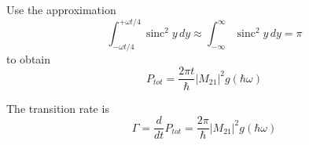 \documentclass[12pt]{article}
\begin{document}
Use the approximation
\begin{equation*}
\int_{-\omega t/4}^{+\omega t/4}\operatorname{sinc}^2 y\,dy
\approx
\int_{-\infty}^\infty\operatorname{sinc}^2 y\,dy=\pi
\end{equation*}
%
to obtain
\begin{equation*}
P_{tot}=\frac{2\pi t}{\hbar}|M_{21}|^2g(\hbar\omega)
\end{equation*}

The transition rate is
\begin{equation*}
\Gamma=\frac{d}{dt}P_{tot}=\frac{2\pi}{\hbar}|M_{21}|^2g(\hbar\omega)
\end{equation*}
\end{document}

